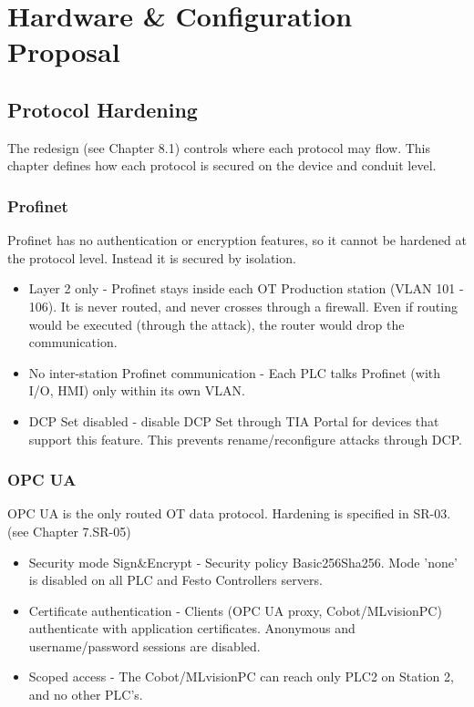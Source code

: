 \documentclass[11pt,a4paper]{article}
\begin{document}
\pagebreak
\section{Hardware \& Configuration Proposal}
\subsection{Protocol Hardening}
The redesign (see Chapter 8.1) controls where each protocol may flow. This
chapter defines how each protocol is secured on the device and conduit level.

\subsubsection{Profinet}
Profinet has no authentication or encryption features, so it cannot be hardened
at the protocol level. Instead it is secured by isolation.
\begin{itemize}

    \item Layer 2 only - Profinet stays inside each OT Production station (VLAN
        101 - 106). It is never routed, and never crosses through a firewall.
        Even if routing would be executed (through the attack), the router would
        drop the communication.

    \item No inter-station Profinet communication - Each PLC talks Profinet
        (with I/O, HMI) only within its own VLAN.

    \item DCP Set disabled - disable DCP Set through TIA Portal for devices
        that support this feature. This prevents rename/reconfigure attacks
        through DCP.

\end{itemize}

\subsubsection{OPC UA}

OPC UA is the only routed OT data protocol. Hardening is specified in SR-03.
(see Chapter 7.SR-05)

\begin{itemize}

    \item Security mode Sign\&Encrypt - Security policy Basic256Sha256. Mode
        'none' is disabled on all PLC and Festo Controllers servers.

    \item Certificate authentication - Clients (OPC UA proxy, Cobot/MLvisionPC)
        authenticate with application certificates. Anonymous and
        username/password sessions are disabled.

    \item Scoped access - The Cobot/MLvisionPC can reach only PLC2 on Station
        2, and no other PLC's.

\end{itemize}
\end{document}
